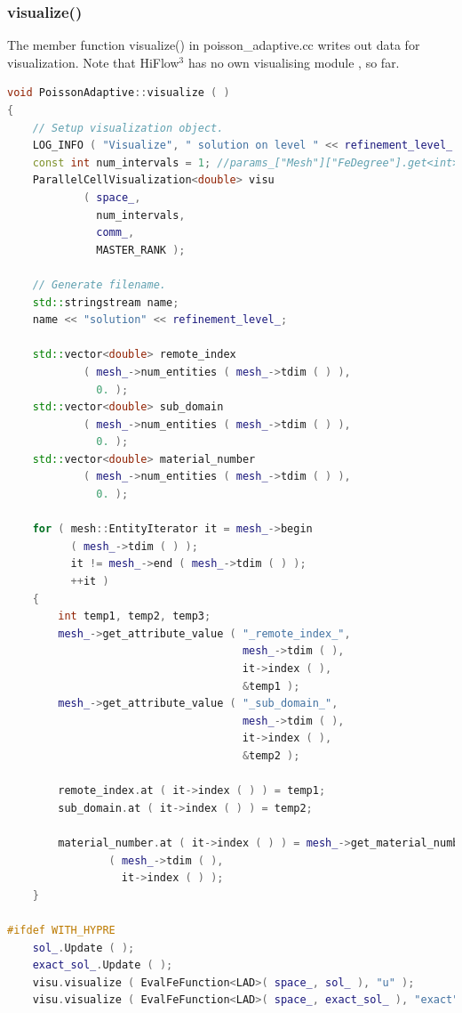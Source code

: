 \documentclass[a4paper, 11pt, twoside]{article}
\begin{document}
\subsubsection{visualize()}\label{sec:visualize}
The member function visualize() in poisson\_adaptive.cc writes out data for visualization. Note that HiFlow$^3$ has no own visualising module , so far.

\begin{lstlisting}[language=C++, basicstyle={\footnotesize, \ttfamily}, keywordstyle=\color{blue}, numbers=none, tabsize=4]
void PoissonAdaptive::visualize ( )
{
    // Setup visualization object.
    LOG_INFO ( "Visualize", " solution on level " << refinement_level_ );
    const int num_intervals = 1; //params_["Mesh"]["FeDegree"].get<int>( 1 );
    ParallelCellVisualization<double> visu
            ( space_,
              num_intervals,
              comm_,
              MASTER_RANK );

    // Generate filename.
    std::stringstream name;
    name << "solution" << refinement_level_;

    std::vector<double> remote_index
            ( mesh_->num_entities ( mesh_->tdim ( ) ),
              0. );
    std::vector<double> sub_domain
            ( mesh_->num_entities ( mesh_->tdim ( ) ),
              0. );
    std::vector<double> material_number
            ( mesh_->num_entities ( mesh_->tdim ( ) ),
              0. );

    for ( mesh::EntityIterator it = mesh_->begin
          ( mesh_->tdim ( ) );
          it != mesh_->end ( mesh_->tdim ( ) );
          ++it )
    {
        int temp1, temp2, temp3;
        mesh_->get_attribute_value ( "_remote_index_",
                                     mesh_->tdim ( ),
                                     it->index ( ),
                                     &temp1 );
        mesh_->get_attribute_value ( "_sub_domain_",
                                     mesh_->tdim ( ),
                                     it->index ( ),
                                     &temp2 );

        remote_index.at ( it->index ( ) ) = temp1;
        sub_domain.at ( it->index ( ) ) = temp2;

        material_number.at ( it->index ( ) ) = mesh_->get_material_number
                ( mesh_->tdim ( ),
                  it->index ( ) );
    }

#ifdef WITH_HYPRE
    sol_.Update ( );
    exact_sol_.Update ( );
    visu.visualize ( EvalFeFunction<LAD>( space_, sol_ ), "u" );
    visu.visualize ( EvalFeFunction<LAD>( space_, exact_sol_ ), "exact" );


\end{lstlisting}
\end{document}
